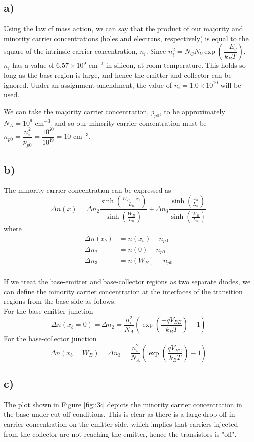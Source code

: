 \subsection*{a)}
	Using the law of mass action, we can say that the product of our majority and minority carrier concentrations (holes and electrons, respectively) is equal to the square of the intrinsic carrier concentration, $n_i$. Since $n_i^2 = N_C N_V \exp\left(\dfrac{-E_g}{k_B T}\right)$, $n_i$ has a value of $6.57 \times 10^{9} \textrm{ cm}^{-3}$ in silicon, at room temperature. This holds so long as the base region is large, and hence the emitter and collector can be ignored. Under an assignment amendment, the value of $n_i = 1.0 \times 10^{10}$ will be used.
	
	We can take the majority carrier concentration, $p_{p0}$, to be approximately $N_A = 10^9 \textrm{ cm}^{-3}$, and so our minority carrier concentration must be $n_{p0} = \dfrac{n_i^2}{p_{p0}} = \dfrac{10^{20}}{10^{19}} = 10 \textrm{ cm}^{-3}$.
\subsection*{b)}
	The minority carrier concentration can be expressed as
	$$\Delta n(x) = 
	\Delta n_2 \frac{\sinh\left(\frac{W_B - x_b}{L_n}\right)}{\sinh\left(\frac{W_B}{L_n}\right)} + 
	\Delta n_3 \frac{\sinh\left(\frac{x_b}{L_n}\right)}{\sinh\left(\frac{W_B}{L_n}\right)}
	$$	
	where
	\[
		\begin{aligned}
		\Delta n(x_b) &= n(x_b) - n_{p0} \\
		\Delta n_2  &= n(0) - n_{p0} \\
		\Delta n_3  &= n(W_B) - n_{p0} \\	
		\end{aligned}
	\]
	
	If we treat the base-emitter and base-collector regions as two separate diodes, we can define the minority carrier concentration at the interfaces of the transition regions from the base side as follows: \\
	
	\noindent For the base-emitter junction
	$$\Delta n(x_b = 0) = \Delta n_2 
			= \frac{n_i^2}{N_A}
			 \left(
				\exp{\left(
					\frac{- q V_{BE}}{k_B T}				
				\right)} - 1
			\right)
	$$
	For the base-collector junction
	$$\Delta n(x_b = W_B) = \Delta n_3
	= \frac{n_i^2}{N_A}
	\left(
		\exp{\left(
			\dfrac{q V_{BC}}{k_B T}				
		\right)} - 1
	\right)
	$$
	
\subsection*{c)}
	The plot shown in Figure \ref{fig::3c} depicts the minority carrier concentration in the base under cut-off conditions. This is clear as there is a large drop off in carrier concentration on the emitter side, which implies that carriers injected from the collector are not reaching the emitter, hence the transistors is "off".
	

